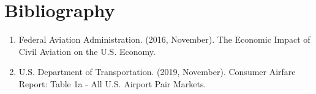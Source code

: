 \documentclass{article}
\begin{document}
\section{Bibliography}
\begin{enumerate}
    \item Federal Aviation Administration. (2016, November). The Economic Impact of Civil Aviation on the U.S. Economy.
    \item U.S. Department of Transportation. (2019, November). Consumer Airfare Report: Table 1a - All U.S. Airport Pair Markets.
\end{enumerate}
\end{document}
